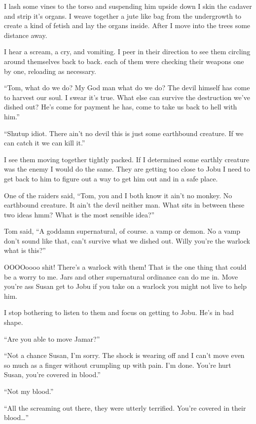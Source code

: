 I lash some vines to the torso and suspending him upside down I skin the cadaver and strip it's organs. I weave together a jute like bag from the undergrowth to create a kind of fetish and lay the organs inside. After I move into the trees some distance away.

I hear a scream, a cry, and vomiting. I peer in their direction to see them circling around themselves back to back. each of them were checking their weapons one by one, reloading as necessary.

``Tom, what do we do? My God man what do we do? The devil himself has come to harvest our soul. I swear it's true. What else can survive the destruction we've dished out? He's come for payment he has, come to take us back to hell with him.''

``Shutup idiot. There ain't no devil this is just some earthbound creature. If we can catch it we can kill it.''

I see them moving together tightly packed. If I determined some earthly creature was the enemy I would do the same. They are getting too close to Jobu I need to get back to him to figure out a way to get him out and in a safe place.

One of the raiders said, ``Tom, you and I both know it ain't no monkey. No earthbound creature. It ain't the devil neither man. What sits in between these two ideas hmm? What is the most sensible idea?''

Tom said, ``A goddamn supernatural, of course. a vamp or demon. No a vamp don't sound like that, can't survive what we dished out. Willy you're the warlock what is this?''

OOOOoooo shit!  There's a warlock with them! That is the one thing that could be a worry to me. Jars and other supernatural ordinance can do me in. Move you're ass Susan get to Jobu if you take on a warlock you might not live to help him.

I stop bothering to listen to them and focus on getting to Jobu. He's in bad shape.

``Are you able to move Jamar?''

``Not a chance Susan, I'm sorry. The shock is wearing off and I can't move even so much as a finger without crumpling up with pain. I'm done. You're hurt Susan, you're covered in blood.''

``Not my blood.''

``All the screaming out there, they were utterly terrified. You're covered in their blood\dots{}''

